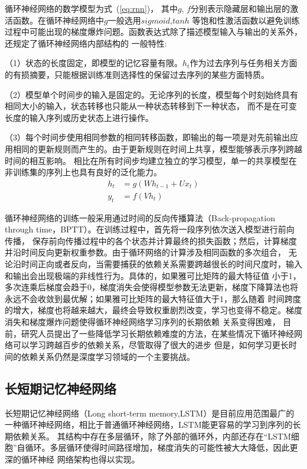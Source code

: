 循环神经网络的数学模型为式~(\ref{eq:rnn})， 其中\(g\), \(f\)分别表示隐藏层和输出层的激活函数。在循环神经网络中\(g\)一般选用\(sigmoid\),\(tanh\)
等饱和性激活函数以避免训练过程中可能出现的梯度爆炸问题。函数表达式除了描述模型输入与输出的关系外，还规定了循环神经网络内部结构的
一般特性:

（1）状态的长度固定，即模型的记忆容量有限。\(h_t\)作为过去序列与任务相关方面的有损摘要，只能根据训练准则选择性的保留过去序列的某些方面特质。

（2）模型单个时间步的输入是固定的。无论序列的长度，模型每个时刻始终具有相同大小的输入，状态转移也只能从一种状态转移到下一种状态，
而不是在可变长度的输入序列或历史状态上进行操作。

（3）每个时间步使用相同参数的相同转移函数，即输出的每一项是对先前输出应用相同的更新规则而产生的。由于更新规则在时间上共享，模型能够表示序列跨越时间的相互影响。
相比在所有时间步均建立独立的学习模型，单一的共享模型在非训练集的序列上也具有良好的泛化能力。
\begin{equation}\label{eq:rnn}
	\begin{split}
		h_{t} &= g(W h_{t-1} + U x_{t})	\\
		y_{t} &= f(V h_{t})						
	\end{split}
\end{equation}

循环神经网络的训练一般采用通过时间的反向传播算法（Back-propagation through time，BPTT）。在训练过程中，首先将一段序列依次送入模型进行前向传播，
保存前向传播过程中的各个状态并计算最终的损失函数；然后，计算梯度并沿时间反向更新权重参数。由于循环网络的计算涉及相同函数的多次组合，
无论沿时间正向或者反向，当需要捕获的依赖关系需要跨越很长的时间尺度时，输入和输出会出现极端的非线性行为。具体的，如果雅可比矩阵的最大特征值
小于1，多次连乘后梯度会趋于0，梯度消失会使得模型参数无法更新，梯度下降算法也将永远不会收敛到最优解；如果雅可比矩阵的最大特征值大于1，那么随着
时间跨度的增大，梯度也将越来越大，最终会导致权重剧烈改变，学习也变得不稳定。梯度消失和梯度爆炸问题使得循环神经网络学习序列的长期依赖
关系变得困难， 目前，研究人员提出了一些降低学习长期依赖难度的方法，在某些情况下循环神经网络可以学习跨越百步的依赖关系，尽管取得了很大的进步
但是，如何学习更长时间的依赖关系仍然是深度学习领域的一个主要挑战。


\subsection{长短期记忆神经网络}
长短期记忆神经网络（Long short-term memory,LSTM）是目前应用范围最广的一种循环神经网络，相比于普通循环神经网络，LSTM能更容易的学习到序列的长期依赖关系。
其结构中存在多层循环，除了外部的循环外，内部还存在“LSTM细胞”自循环。多层循环使得时间路径增加，梯度消失的可能性被大大降低，因此更深的循环神经
网络架构也得以实现。

